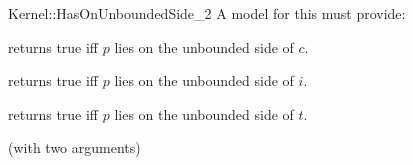 \begin{ccRefFunctionObjectConcept}{Kernel::HasOnUnboundedSide_2}
A model for this must provide:


{returns true iff $p$ lies on the unbounded side of $c$.}

{returns true iff $p$ lies on the unbounded side of $i$.}

{returns true iff $p$ lies on the unbounded side of $t$.}

\ccRefines
{} (with two arguments)

\ccSeeAlso
{} \\
\\
\\

\end{ccRefFunctionObjectConcept}
